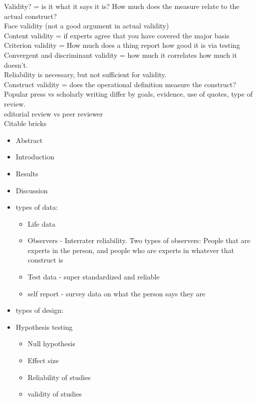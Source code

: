 \documentclass{report}
\begin{document}
Validity? = is it what it says it is? How much does the measure relate to the actual construct? \\ 
Face validity (not a good argument in actual validity) \\
Content validity = if experts agree that you have covered the major basis \\ 
Criterion validity = How much does a thing report how good it is via testing \\
Convergent and discriminant validity = how much it correlates how much it doesn't. \\
Reliability is necessary, but not sufficient for validity. \\ 
Construct validity = does the operational definition measure the construct? \\
Popular press vs scholarly writing differ by goals, evidence, use of quotes, type of review. \\ 
editorial review vs peer reviewer \\ 
Citable bricks \\
\begin{itemize}
    \item Abstract
    \item Introduction 
    \item Results 
    \item Discussion
\end{itemize}

\begin{itemize}
    \item types of data: 
    \begin{itemize}
        \item Life data 
        \item Observers - Interrater reliability. Two types of observers: People that are experts in the person, and people who 
        are experts in whatever that construct is 
        \item Test data - super standardized and reliable
        \item self report - survey data on what the person says they are  
    \end{itemize}
    \item types of design: 
    \item Hypothesis testing
    \begin{itemize}
        \item Null hypothesis
        \item Effect size 
        \item Reliability of studies 
        \item validity of studies 
    \end{itemize}
\end{itemize}
\end{document}
